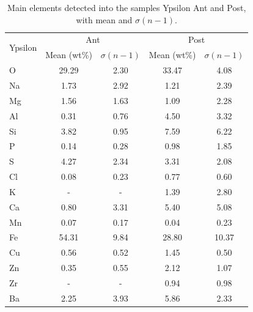\begin{table}[H]\centering
  \begin{tabular}{lcccc}
    \toprule
    \multirow{2}{*}[-0.5\dimexpr \aboverulesep + \belowrulesep + \cmidrulewidth]{Ypsilon}
    & \multicolumn{2}{c}{Ant} & \multicolumn{2}{c}{Post} \\
    \cmidrule(l){2-3} \cmidrule(l){4-5}
    & Mean (wt\%) & $\sigma (n-1)$ & Mean (wt\%) & $\sigma (n-1)$ \\
    \midrule
    O & 29.29 & 2.30 & 33.47 & 4.08 \\
    Na & 1.73 & 2.92 & 1.21 & 2.39 \\
    Mg & 1.56 & 1.63 & 1.09 & 2.28 \\
    Al & 0.31 & 0.76 & 4.50 & 3.32 \\
    Si & 3.82 & 0.95 & 7.59 & 6.22 \\
    P & 0.14 & 0.28 & 0.98 & 1.85 \\
    S & 4.27 & 2.34 & 3.31 & 2.08 \\
    Cl & 0.08 & 0.23 & 0.77 & 0.60 \\
    K & - & - & 1.39 & 2.80 \\
    Ca & 0.80 & 3.31 & 5.40 & 5.08 \\
    Mn & 0.07 & 0.17 & 0.04 & 0.23 \\
    Fe & 54.31 & 9.84 & 28.80 & 10.37 \\
    Cu & 0.56 & 0.52 & 1.45 & 0.50 \\
    Zn & 0.35 & 0.55 & 2.12 & 1.07 \\
    Zr & - & - & 0.94 & 0.98 \\
    Ba & 2.25 & 3.93 & 5.86 & 2.33 \\
    \bottomrule
  \end{tabular}
    \caption{Main elements detected into the samples Ypsilon Ant and Post, with mean and $\sigma (n-1)$.}
    \label{fig:Elements_Ypsilon}
\end{table}

